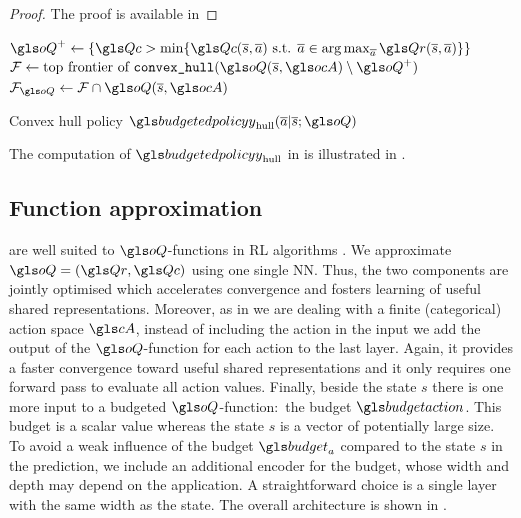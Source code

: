 \begin{proof}
    The proof is available in 
\end{proof}

\begin{algorithm}
    \DontPrintSemicolon
    $\oQ^+\leftarrow \{\Qc > \min \{\Qc(\os,\oa) \text{ s.t. }\oa\in\argmax_{\oa} \Qr(\os,\oa)\} \}$\;
    $\cF \leftarrow \text{top frontier of }\texttt{convex\_hull}(\oQ(\os,\ocA) \setminus \oQ^+)$\;
    $\cF_{\oQ} \leftarrow \cF\cap \oQ(\os,\ocA)$\;
    \caption{Convex hull policy $\budgetedpolicy_\text{hull}(\oa|\os; \oQ)$}
    \label{algo:pi_hull}
\end{algorithm}

The computation of $\budgetedpolicy_\text{hull}$ in  is illustrated in .

\subsection{Function approximation}

 are well suited to  $\oQ$-functions in \gls{RL} algorithms \parencite{Riedmiller05,Mnih2015}. We approximate $\oQ = (\Qr, \Qc)$ using one single \gls{NN}. Thus, the two components are jointly optimised which accelerates convergence and fosters learning of useful shared representations. Moreover, as in \parencite{Mnih2015} we are dealing with a finite (categorical) action space $\cA$, instead of including the action in the input we add the output of the $\oQ$-function for each action to the last layer. Again, it provides a faster convergence toward useful shared representations and it only requires one forward pass to evaluate all action values. Finally, beside the state $s$ there is one more input to a budgeted $\oQ$-function:~the budget $\budgetaction$. This budget is a scalar value whereas the state $s$ is a vector of potentially large size. To avoid a weak influence of the budget $\budget_a$ compared to the state $s$ in the prediction, we include an additional encoder for the budget, whose width and depth may depend on the application. A straightforward choice is a single layer with the same width as the state. The overall architecture is shown in .


